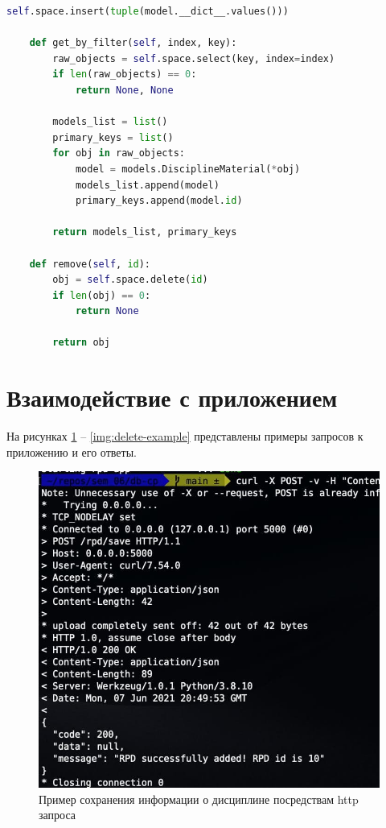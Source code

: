 \begin{lstlisting}[label=lst:db-tarantool, caption=Листинг модуля взаимодействия с СУБД Tarantool, language=python]
		self.space.insert(tuple(model.__dict__.values()))
	
	def get_by_filter(self, index, key):
		raw_objects = self.space.select(key, index=index)
		if len(raw_objects) == 0:
			return None, None
		
		models_list = list()
		primary_keys = list()
		for obj in raw_objects:
			model = models.DisciplineMaterial(*obj)
			models_list.append(model)
			primary_keys.append(model.id)
		
		return models_list, primary_keys
	
	def remove(self, id):
		obj = self.space.delete(id)
		if len(obj) == 0:
			return None
		
		return obj
\end{lstlisting}


\section{Взаимодействие с приложением}

На рисунках \ref{img:save-example} -- \ref{img:delete-example} представлены примеры запросов к приложению и его ответы.

\begin{figure}[h!]
	\begin{center}
		\includegraphics[scale=0.8]{img/save_example.jpg}
	\end{center}
	\captionsetup{justification=centering}
	\caption{Пример сохранения информации о дисциплине посредствам http запроса}
	\label{img:save-example}
\end{figure}


